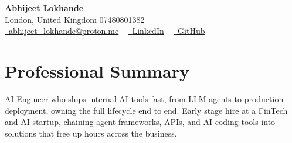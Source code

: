 \documentclass[a4paper,10pt]{article}
\begin{document}
    \begin{center}
        {\Huge\bfseries Abhijeet Lokhande}
        \\[2pt] {\color{muted}London, United Kingdom \textbar{} 07480801382}\\
        \small
        \href{mailto:abhijeet_lokhande@proton.me}{\raisebox{-0.2\height}{\color{primary}\faEnvelope}\  \underline{abhijeet\_lokhande@proton.me}} ~
        \href{https://www.linkedin.com/in/ablds/}{\raisebox{-0.2\height}{\color{primary}\faLinkedin}\ \underline{LinkedIn}}  ~
        \href{https://github.com/abhijeetscode}{\raisebox{-0.2\height}{\color{primary}\faGithub}\ \underline{GitHub}}
    \end{center}

\section{Professional Summary}
\vspace{-5pt}
{\color{muted}AI Engineer who ships internal AI tools fast, from LLM agents to production deployment, owning the full lifecycle end to end. Early stage hire at a FinTech and AI startup, chaining agent frameworks, APIs, and AI coding tools into solutions that free up hours across the business.}
\vspace{2pt}

\end{document}
